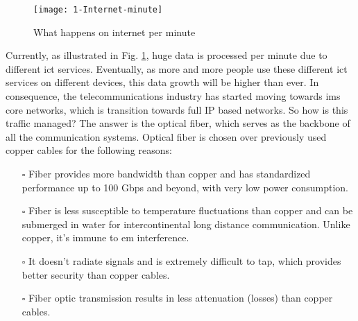 \documentclass[../report.tex]{subfiles}
\begin{document}
\begin{figure}[!tbp]
	\centering
	\texttt{[image: 1-Internet-minute]}
	\caption{What happens on internet per minute \cite{internet_minute}}
	\label{fig:1_internet_minute}
\end{figure}
Currently, as illustrated in Fig. \ref{fig:1_internet_minute}, huge data is processed per minute due to different \gls{ict} services. Eventually, as more and more people use these different \gls{ict} services on different devices, this data growth will be higher than ever. In consequence, the telecommunications industry has started moving towards \gls{ims} core networks, which is transition towards full IP based networks. So how is this traffic managed? The answer is the optical fiber, which serves as the backbone of all the communication systems. Optical fiber is chosen over previously used copper cables for the following reasons:
\begin{itemize}
	\item[$\square$] Fiber provides more bandwidth than copper and has standardized performance up to 100 Gbps and beyond, with very low power consumption.
	\item[$\square$] Fiber is less susceptible to temperature fluctuations than copper  and can be submerged in water for intercontinental long distance communication. Unlike copper, it’s immune to \gls{em} interference. 
	\item[$\square$] It doesn’t radiate signals and is extremely difficult to tap, which provides better security than copper cables.
	\item[$\square$] Fiber optic transmission results in less attenuation (losses) than copper cables.
\end{itemize}
\end{document}
